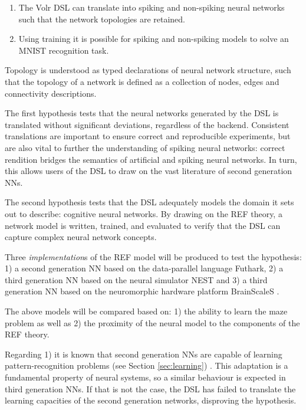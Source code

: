 \documentclass[report.tex]{subfiles}
\begin{document}
\begin{enumerate}
  \item The Volr DSL can translate into spiking and non-spiking neural networks such that the network topologies are retained.
  \item Using training it is possible for spiking and non-spiking models to solve an MNIST recognition task.
\end{enumerate}

Topology is understood as typed declarations of neural network structure, such
that the topology of a network is defined as a collection of nodes, edges and connectivity descriptions.

The first hypothesis tests that the neural networks generated by the DSL is translated without significant
deviations, regardless of the backend.
Consistent translations are important to ensure correct and reproducible experiments,
but are also vital to further the understanding of spiking neural networks:
correct rendition bridges the semantics of artificial and spiking neural networks.
In turn, this allows users of the DSL to draw on the vast literature of
second generation \gls{NN}s.

The second hypothesis tests that the DSL adequately models the domain it sets
out to describe: cognitive neural networks.
By drawing on the REF theory, a network model is written, trained, and evaluated to verify
that the DSL can capture complex neural network concepts.

Three \textit{implementation}s of the \gls{REF} model will be
produced to test the hypothesis: 
  1) a second generation \gls{NN} based on the data-parallel language Futhark, 
  2) a third generation \gls{NN} based on the neural simulator NEST and
  3) a third generation \gls{NN} based on the neuromorphic 
     hardware platform BrainScaleS .

The above models will be compared based on:
1) the ability to learn the maze problem as well as 
2) the proximity of the neural model to the components of the
   \gls{REF} theory.

Regarding 1) it is known that second generation \gls{NN}s are
capable of learning pattern-recognition problems (see Section \ref{sec:learning})
\cite{Russel2007}.
This adaptation is a fundamental property of neural systems, so a
similar behaviour is expected in third generation \gls{NN}s.
If that is not the case, the \gls{DSL} has failed to translate
the learning capacities of the second generation networks,
disproving the hypothesis.
\end{document}
